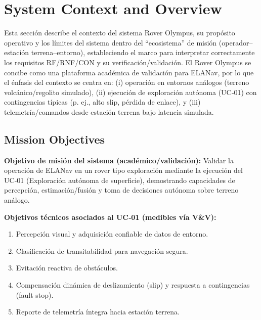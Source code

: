 
\section{System Context and Overview}\label{sec:system_context}

Esta sección describe el contexto del sistema Rover Olympus, su propósito operativo y los límites del sistema dentro del ``ecosistema'' de misión (operador–estación terrena–entorno), estableciendo el marco para interpretar correctamente los requisitos RF/RNF/CON y su verificación/validación. \cite{omg_sysml_mbse, nasa_cm, segoldmine_ppi}  
El Rover Olympus se concibe como una plataforma académica de validación para ELANav, por lo que el énfasis del contexto se centra en: (i) operación en entornos análogos (terreno volcánico/regolito simulado), (ii) ejecución de exploración autónoma (UC‑01) con contingencias típicas (p. ej., alto slip, pérdida de enlace), y (iii) telemetría/comandos desde estación terrena bajo latencia simulada. \cite{nasa_cm, segoldmine_ppi, omg_sysml_mbse}  

\subsection{Mission Objectives}\label{subsec:mission_objectives}

\textbf{Objetivo de misión del sistema (académico/validación):} Validar la operación de ELANav en un rover tipo exploración mediante la ejecución del UC‑01 (Exploración autónoma de superficie), demostrando capacidades de percepción, estimación/fusión y toma de decisiones autónoma sobre terreno análogo. \cite{omg_sysml_mbse, nasa_cm, segoldmine_ppi}  

\textbf{Objetivos técnicos asociados al UC‑01 (medibles vía V\&V):}
\begin{enumerate}
    \item Percepción visual y adquisición confiable de datos de entorno.
    \item Clasificación de transitabilidad para navegación segura.
    \item Evitación reactiva de obstáculos.
    \item Compensación dinámica de deslizamiento (slip) y respuesta a contingencias (fault stop).
    \item Reporte de telemetría íntegra hacia estación terrena. \cite{nasa_cm, segoldmine_ppi, omg_sysml_mbse}
\end{enumerate}

